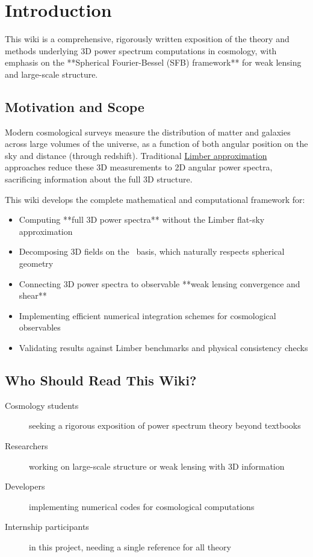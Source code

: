 \section{Introduction}\label{sec:intro}

This wiki is a comprehensive, rigorously written exposition of the theory and methods underlying 3D power spectrum computations in cosmology, with emphasis on the **Spherical Fourier-Bessel (SFB) framework** for weak lensing and large-scale structure.

\subsection{Motivation and Scope}\label{subsec:intro_motivation}

Modern cosmological surveys measure the distribution of matter and galaxies across large volumes of the universe, as a function of both angular position on the sky and distance (through redshift). Traditional \hyperlink{sec:limber}{Limber approximation} approaches reduce these 3D measurements to 2D angular power spectra, sacrificing information about the full 3D structure.

This wiki develops the complete mathematical and computational framework for:

\begin{itemize}
    \item Computing **full 3D power spectra** without the Limber flat-sky approximation
    \item Decomposing 3D fields on the \sfb\ basis, which naturally respects spherical geometry
    \item Connecting 3D power spectra to observable **weak lensing convergence and shear**
    \item Implementing efficient numerical integration schemes for cosmological observables
    \item Validating results against Limber benchmarks and physical consistency checks
\end{itemize}

\subsection{Who Should Read This Wiki?}\label{subsec:intro_audience}

\begin{description}
    \item[Cosmology students] seeking a rigorous exposition of power spectrum theory beyond textbooks
    \item[Researchers] working on large-scale structure or weak lensing with 3D information
    \item[Developers] implementing numerical codes for cosmological computations
    \item[Internship participants] in this project, needing a single reference for all theory
\end{description}

